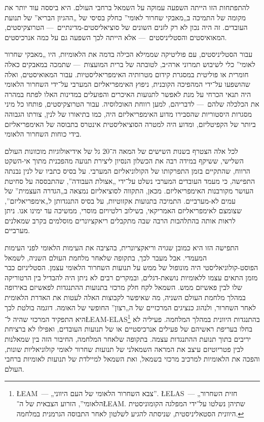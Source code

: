 להתפתחות הזו הייתה השפעה עמוקה על השמאל ברחבי העולם. היא ביססה עוד יותר את מקומה של התמיכה ב„מאבקי שחרור לאומי” כחלק בסיסי של „ההגיון הבריא” של תנועת העובדים. זה היה נכון לא רק לזנים השונים של סוציאליסטים-מדינתיים~— הטרוצקיסטים, המאואיסטים והסטליניסטים~— אלא הייתה לכך השפעה גם על כמה אנרכיסטים.

עבור הסטליניסטים, עם פוליטיקה שממילא הכילה בדמה את הלאומיות, היו „מאבקי שחרור לאומי” כלי לשיבוש תמרוני ארה״ב, לטובתה של ברית המועצות~— שתמכה במאבקים כאלה חומרית או פוליטית במסגרת קידום מטרותיה האימפריאליסטיות. עבור המאואיסטים, ואלה שהושפעו על־ידי המהפיכה הקובנית, ניפוץ האימפריאליזם המערבי על־ידי השחרור הלאומי היה תנאי הכרחי על מנת לאפשר לתנועות האיכרים והפועלים במדינות האלו לפתח במהרה את הכלכלה שלהם~— לדבריהם, למען רווחת האוכלוסיה. עבור הטרוצקיסטים, פותחו כל מיני מסגרות היסטוריות שהסבירו מדוע האימפריאליזם היה, כמו בתיאורו של לנין, צורתו הגבוהה ביותר של הקפיטליזם, ומדוע היה למטרה הסוציאליסטית אינטרס בתבוסה של האימפריאליזם בידי כוחות השחרור הלאומי.

לכל אלה הצטרף בשנות השישים של המאה ה־20 גל של אידיאולוגיות מוכוונות העולם השלישי, ששיקף במידה רבה את הכשלון הנסיון ליצירת תנועה מהפכנית מתוך אי-השקט הרווח, שהתקיים בזמן התפרקותו של הקולוניאליזם המערבי. על בסיס כתביו של לנין נבנתה התפישה, כי מעמד העובדים המערבי נשלט על־ידי „אצולת העבודה”, שהתבססה על סחיטת העושר מקורבנות האימפריאליזם. מכאן, התקווה לסוציאליזם נמצאה ב„הגדרה העצמית” של עמים לא-מערביים. התמיכה בתנועות אקזוטיות, על בסיס התנגדותן ל„אימפריאליזם”, שצומצם לאימפריאליזם האמריקאי, בשילוב רלטיויזם מוסרי, ממשיכה עד ימינו אנו. ניתן לראות אותה בהתלהבות הרבה שבה מתקבלים ריאקציונרים מוסלמים בקרב שמאלנים מערביים.

התפישה הזו היא כמובן שגויה וריאקציונרית, בהציבה את העימות הלאומי לפני העימות המעמדי. אבל מעבר לכך, בתקופה שלאחר מלחמת העולם השניה, לשמאל הפוסט-קולוניאליסטי היה מונופול של ממש על תנועות השחרור הלאומי עצמן. הסטליניזם כבר מזמן התאים עצמו ללאומיות נושאת-דגלים, ובמקרים רבים לא ניתן היה להבדיל בין הרטוריקה שלו לבין פאשיזם ממש. השמאל לקח חלק מרכזי בתנועות ההתנגדות לפאשיזם באירופה במהלך מלחמת העולם השניה, מה שאיפשר לקבוצות האלה לעטות את האדרת הלאומית לאחר השחרור, ולנהוג כנציגים המרכזיים של ה„רצון” החופשי של האומה. דוגמה בולטת לכך היא התפקיד המרכזי שהיה ל־\L{EAM-ELAS}\footnote{\L{EAM}~— „צבא השחרור הלאומי של העם היווני”. \L{ELAS}~— „חזית השחרור הלאומי”, הזרוע הצבאית של ה־\L{EAM}. שתיהן נשלטו על־ידי המפלגה הקומוניסטית היוונית הסטאליניסטית, שניסתה להגיע לשלטון לאחר התבוסה הגרמנית במלחמה.} בהתנגדות היוונית במהלך המלחמה. פעיליה לא בחלו בעריפת ראשיהם של פעילים אנרכיסטיים או של תנועות העובדים, ואפילו לא ברציחת יריבים בתוך תנועת ההתנגדות עצמה. בתקופה שלאחר המלחמה, החיבור הזה בין שמאלנות לבין פטריוטיזם עיצב את המראה השמאלני של תנועות שחרור לאומי קולוניאליות שונות, והפכה את הלאומיות למרכיב מרכזי בשמאל, ואת השמאל למיילדת של תנועות לאומיות ברחבי העולם.

